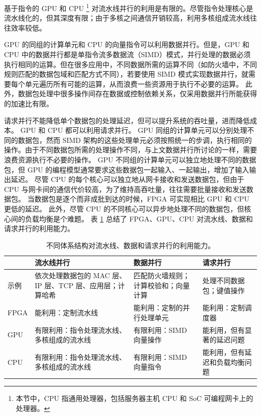 基于指令的 GPU 和 CPU \footnote{本节中，CPU 指通用处理器，包括服务器主机 CPU 和 SoC 可编程网卡上的处理器。} 对流水线并行的利用是有限的。尽管指令处理核心是流水线化的，但其深度有限；由于多核之间通信开销较高，利用多核组成流水线往往效率较低。

GPU 的同组的计算单元和 CPU 的向量指令可以利用数据并行。但是，GPU 和 CPU 中的数据并行都是单指令流多数据流（SIMD）模式，并行处理的数据必须执行相同的运算。但在很多应用中，不同数据所需的运算不同（如防火墙中，不同规则匹配的数据包域和匹配方式不同），若要使用 SIMD 模式实现数据并行，就需要每个单元遍历所有可能的运算，从而浪费一些资源用于执行不必要的运算。
此外，数据包处理中很多操作间存在数据或控制依赖关系，仅采用数据并行所能获得的加速比有限。

请求并行不能降低单个数据包的处理延迟，但可以提升系统的吞吐量，进而降低成本。
GPU 和 CPU 都可以利用请求并行。
GPU 同组的计算单元可以分别处理不同的数据包，然而 SIMD 架构的这些处理单元必须按照统一的步调，执行相同的操作。由于不同数据包所需的处理操作不同，与上文数据并行所讨论的一样，需要浪费资源执行不必要的操作。
GPU 不同组的计算单元可以独立地处理不同的数据包，但 GPU 的编程模型通常要求这些数据包一起输入、一起输出，增加了输入输出延迟。
尽管 CPU 的每个核心可以独立地从网卡接收和发送数据包，但由于 CPU 与网卡间的通信代价较高，为了维持高吞吐量，往往需要批量接收和发送数据包。
当数据包是逐个而非成批到达的时候，FPGA 可实现相比 GPU 和 CPU 更低的延迟。
此外，尽管 CPU 的不同核心可以异步地处理不同的数据包，但核心间的负载均衡是个难题。
表 \ref{background:tab:fpga-parallelism} 总结了 FPGA、GPU、CPU 对流水线、数据和请求并行的利用能力。

\begin{table}[htbp]
	\centering
	\caption{不同体系结构对流水线、数据和请求并行的利用能力。}
	\small
	\begin{tabular}{l|p{}|p{}|p{}}
		\hline
		& 流水线并行 & 数据并行 & 请求并行 \\
		\hline
		\hline
		示例 & 依次处理数据包的 MAC 层、IP 层、TCP 层、应用层；计算哈希 & 匹配防火墙规则；计算校验和；向量计算 & 处理不同数据包；键值操作 \\
		\hline
		FPGA & 能利用：定制流水线 & 能利用：定制的并行处理单元 & 能利用：定制调度器 \\
		\hline
		GPU & 有限利用：指令处理流水线、多核组成的流水线 & 有限利用：SIMD 向量操作 & 能利用，但有显著的延迟问题 \\
		\hline
		CPU & 有限利用：指令处理流水线、多核组成的流水线 & 有限利用：SIMD 向量指令 & 能利用，但有延迟和负载均衡问题 \\
		\hline
	\end{tabular}
	\label{background:tab:fpga-parallelism}
\end{table}


